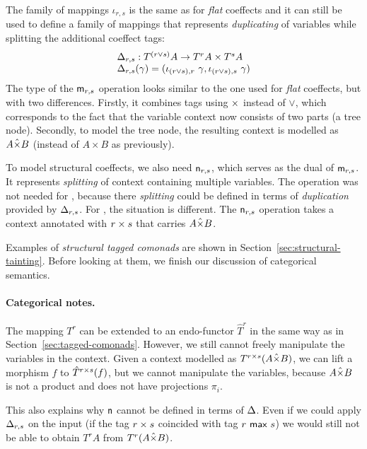 The family of mappings $\iota_{r, s}$ is the same as for \emph{flat} coeffects
and it can still be used to define a family of mappings that represents \emph{duplicating}
of variables while splitting the additional coeffect tags:
%
\begin{equation*}
\begin{array}{l}
\Delta_{r, s} : T^{(r \vee s)}A \rightarrow T^r A \times T^s A\\
\Delta_{r, s}(\gamma) = (\iota_{(r\vee s), r}~\gamma, \iota_{(r\vee s), s}~\gamma)
\end{array}
\end{equation*}
%
The type of the $\textnormal{\sffamily m}_{r,s}$ operation looks similar to the one used for \emph{flat} coeffects,
but with two differences. Firstly, it combines tags using $\times$ instead of $\vee$, 
which corresponds to the fact that the variable context now consists of two parts (a tree node).
Secondly, to model the tree node, the resulting context is modelled as $A \hat{\times} B$
(instead of $A \times B$ as previously).

To model structural coeffects, we also need $\textnormal{\sffamily n}_{r, s}$, which serves as the dual
of $\textnormal{\sffamily m}_{r, s}$. It represents \emph{splitting} of context containing multiple 
variables. The operation was not needed for \clflt, because there \emph{splitting} could
be defined in terms of \emph{duplication} provided by $\Delta_{r, s}$. For \clstr,
the situation is different. The $\textnormal{\sffamily n}_{r, s}$ operation takes a context annotated
with $r \times s$ that carries $A \hat{\times} B$.

Examples of \emph{structural tagged comonads} are shown in Section~\ref{sec:structural-tainting}.
Before looking at them, we finish our discussion of categorical semantics.

\paragraph{Categorical notes.}
The mapping $T^r$ can be extended to an endo-functor $\hat{T}^r$ in the same way as in
Section~\ref{sec:tagged-comonads}. However, we still cannot freely manipulate the 
variables in the context. Given a context modelled as $T^{r \times s}(A \hat{\times} B)$,
we can lift a morphism $f$ to $\hat{T}^{r \times s}(f)$, but we cannot manipulate the
variables, because $A \hat{\times} B$ is not a product and does not have projections $\pi_i$.

This also explains why $\textnormal{\sffamily n}$ cannot be defined in terms of $\Delta$. Even if we 
could apply $\Delta_{r, s}$ on the input (if the tag $r \times s$ coincided
with tag $r ~\textnormal{\sffamily max}~ s$) we would still not be able to obtain $T^r A$ from $T^r (A \hat{\times} B)$.

